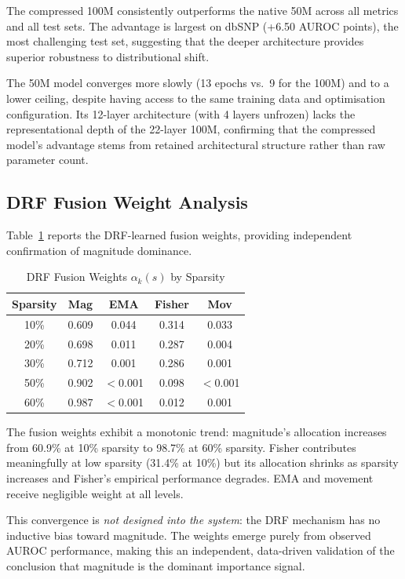 \documentclass[journal]{IEEEtran}
\begin{document}
The compressed 100M consistently outperforms the native 50M
across all metrics and all test sets.
The advantage is largest on dbSNP (+6.50 AUROC points), the
most challenging test set, suggesting that the deeper
architecture provides superior robustness to distributional
shift.

The 50M model converges more slowly (13 epochs vs.\ 9 for
the 100M) and to a lower ceiling, despite having access to
the same training data and optimisation configuration.
Its 12-layer architecture (with 4 layers unfrozen) lacks the
representational depth of the 22-layer 100M, confirming that
the compressed model's advantage stems from retained
architectural structure rather than raw parameter count.

\subsection{DRF Fusion Weight Analysis}

Table~\ref{tab:drf_weights} reports the DRF-learned fusion
weights, providing independent confirmation of magnitude
dominance.

\begin{table}[!t]
\centering
\caption{DRF Fusion Weights $\alpha_k(s)$ by Sparsity}
\label{tab:drf_weights}
\renewcommand{\arraystretch}{1.2}
\begin{tabular}{@{}ccccc@{}}
\toprule
\textbf{Sparsity} & \textbf{Mag} & \textbf{EMA} &
\textbf{Fisher} & \textbf{Mov} \\
\midrule
10\% & 0.609 & 0.044 & 0.314 & 0.033 \\
20\% & 0.698 & 0.011 & 0.287 & 0.004 \\
30\% & 0.712 & 0.001 & 0.286 & 0.001 \\
50\% & 0.902 & $<$0.001 & 0.098 & $<$0.001 \\
60\% & 0.987 & $<$0.001 & 0.012 & 0.001 \\
\bottomrule
\end{tabular}
\end{table}

The fusion weights exhibit a monotonic trend: magnitude's
allocation increases from 60.9\% at 10\% sparsity to 98.7\%
at 60\% sparsity.
Fisher contributes meaningfully at low sparsity (31.4\% at
10\%) but its allocation shrinks as sparsity increases and
Fisher's empirical performance degrades.
EMA and movement receive negligible weight at all levels.

This convergence is \emph{not designed into the system}: the
DRF mechanism has no inductive bias toward magnitude.
The weights emerge purely from observed AUROC performance,
making this an independent, data-driven validation of the
conclusion that magnitude is the dominant importance signal.
\end{document}
